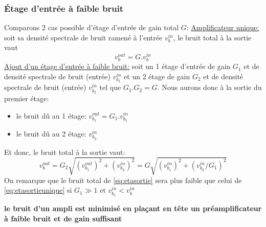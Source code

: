 \subsubsection{Étage d'entrée à faible bruit} \label{subsubsec:entreenobruit}
Comparons 2 cas possible d'étage d'entrée de gain total \(G\):\bigbreak
\underline{Amplificateur unique:}  soit sa densité spectrale de bruit ramené à l'entrée \(v_b^{in}\), le bruit total à la sortie vaut
\begin{equation}\label{eq:etasortieunique}
v_b^{out}=G . v_b^{in}
\end{equation}
\underline{Ajout d'un étage d'entrée à faible bruit:} soit un 1 étage d'entrée de gain \(G_1\) et de densité spectrale de bruit (entrée) \(v_{b_1}^{in}\) et un 2 étage de gain \(G_2\) et de densité spectrale de bruit (entrée) \(v_{b_2}^{in}\) tel que \(G_1 . G_2 = G\). Nous aurons donc à la sortie du premier étage:
\begin{itemize}
	\item le bruit dû au 1 étage: \(v_{b_1}^{out}=G_1 . v_{b_1}^{in}\)
	\item le bruit dû au 2 étage: \(v_{b_2}^{in}\)
\end{itemize}
Et donc, le bruit total à la sortie vaut:
\begin{equation}\label{eq:etasortie}
v_b^{out} = G_2\sqrt{\left(v_{b_1}^{out}\right)^2 + \left(v_{b_2}^{in}\right)^2} = G\sqrt{\left(v_{b_1}^{in}\right)^2 + \left(v_{b_2}^{in}/G_1\right)^2}
\end{equation}
On remarque que le bruit total de \eqref{eq:etasortie} sera plus faible que celui de \eqref{eq:etasortieunique} si \(G_1\gg 1\text{ et } v_{b_1}^{in}<v_b^{in}\)
\begin{center}
	\textbf{le bruit d'un ampli est minimisé en plaçant en tête un préamplificateur à faible bruit et de gain suffisant}
\end{center}

